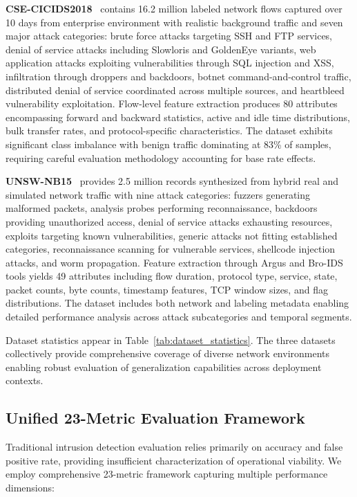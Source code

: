 \textbf{CSE-CICIDS2018}~\cite{sharafaldin2018toward} contains 16.2 million labeled network flows captured over 10 days from enterprise environment with realistic background traffic and seven major attack categories: brute force attacks targeting SSH and FTP services, denial of service attacks including Slowloris and GoldenEye variants, web application attacks exploiting vulnerabilities through SQL injection and XSS, infiltration through droppers and backdoors, botnet command-and-control traffic, distributed denial of service coordinated across multiple sources, and heartbleed vulnerability exploitation. Flow-level feature extraction produces 80 attributes encompassing forward and backward statistics, active and idle time distributions, bulk transfer rates, and protocol-specific characteristics. The dataset exhibits significant class imbalance with benign traffic dominating at 83\% of samples, requiring careful evaluation methodology accounting for base rate effects.

\textbf{UNSW-NB15}~\cite{moustafa2015unsw} provides 2.5 million records synthesized from hybrid real and simulated network traffic with nine attack categories: fuzzers generating malformed packets, analysis probes performing reconnaissance, backdoors providing unauthorized access, denial of service attacks exhausting resources, exploits targeting known vulnerabilities, generic attacks not fitting established categories, reconnaissance scanning for vulnerable services, shellcode injection attacks, and worm propagation. Feature extraction through Argus and Bro-IDS tools yields 49 attributes including flow duration, protocol type, service, state, packet counts, byte counts, timestamp features, TCP window sizes, and flag distributions. The dataset includes both network and labeling metadata enabling detailed performance analysis across attack subcategories and temporal segments.

Dataset statistics appear in Table~\ref{tab:dataset_statistics}. The three datasets collectively provide comprehensive coverage of diverse network environments enabling robust evaluation of generalization capabilities across deployment contexts.

\subsection{Unified 23-Metric Evaluation Framework}

Traditional intrusion detection evaluation relies primarily on accuracy and false positive rate, providing insufficient characterization of operational viability. We employ comprehensive 23-metric framework capturing multiple performance dimensions:


